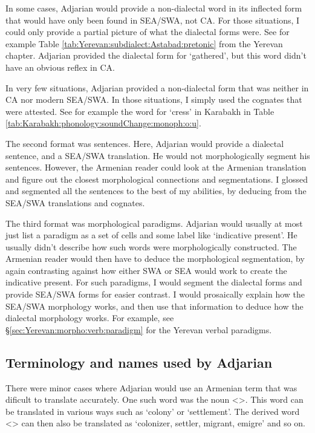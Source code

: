 In some cases, Adjarian would provide a non-dialectal word in its inflected form that would have only been found in SEA/SWA, not CA. For those situations, I could only provide a partial picture of what the dialectal forms were. See for example  Table \ref{tab:Yerevan:subdialect:Astabad:pretonic} from the Yerevan chapter. Adjarian provided the dialectal form for `gathered', but this word didn't have an obvious reflex in CA. 


In very few situations, Adjarian provided a non-dialectal form that was neither in CA nor modern SEA/SWA. In those situations, I simply used the cognates that were attested. See for example the word for `cress' in Karabakh in Table \ref{tab:Karabakh:phonology:soundChange:monoph:o:u}. 


The second format was   sentences. Here, Adjarian would provide a dialectal sentence, and a SEA/SWA translation. He would not morphologically segment his sentences. However, the Armenian reader could look at the Armenian translation and figure out the closest morphological connections and segmentations. I glossed and segmented all the sentences to the best of my abilities, by deducing from the SEA/SWA translations and cognates. 

The third format was morphological paradigms. Adjarian would usually at most just list a paradigm as a set of cells and some label like `indicative present'. He usually didn't describe how such words were morphologically constructed. The Armenian reader would then have to deduce the morphological segmentation, by again contrasting against how either SWA or SEA would work to  create the indicative present. For such paradigms, I would segment the dialectal forms and provide SEA/SWA forms for easier contrast. I would prosaically explain how the SEA/SWA morphology works, and then use that information to deduce how the dialectal morphology works. For example, see \S\ref{sec:Yerevan:morpho:verb:paradigm} for the Yerevan verbal paradigms. 



\subsection{Terminology and names used by Adjarian}\label{sec:HossepIntro:translation:name}

There were minor cases where Adjarian would use an Armenian term that was dificult to translate accurately. One such word was the noun <>. This word can be translated in various ways such as `colony' or `settlement'. The derived word <> can then also be translated as `colonizer, settler, migrant, emigre' and so on. 

